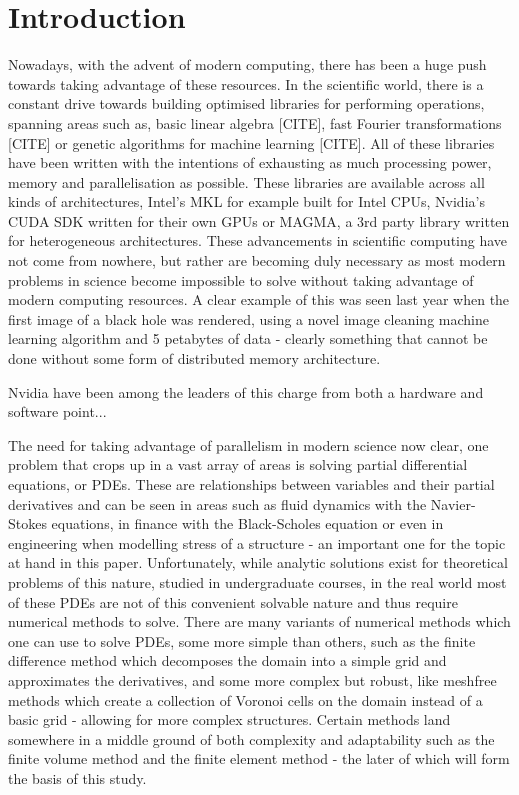 \clearpage
\chapter{Introduction}

Nowadays, with the advent of modern computing, there has been a huge push towards taking advantage of these resources. In the scientific world, there is a constant drive towards building optimised libraries for performing operations, spanning areas such as, basic linear algebra [CITE], fast Fourier transformations [CITE] or genetic algorithms for machine learning [CITE]. All of these libraries have been written with the intentions of exhausting as much processing power, memory and parallelisation as possible. These libraries are available across all kinds of architectures, Intel's MKL for example built for Intel CPUs, Nvidia's CUDA SDK written for their own GPUs or MAGMA, a 3rd party library written for heterogeneous architectures. These advancements in scientific computing have not come from nowhere, but rather are becoming duly necessary as most modern problems in science become impossible to solve without taking advantage of modern computing resources. A clear example of this was seen last year when the first image of a black hole was rendered, using a novel image cleaning machine learning algorithm and 5 petabytes of data - clearly something that cannot be done without some form of distributed memory architecture.

Nvidia have been among the leaders of this charge from both a hardware and software point...

The need for taking advantage of parallelism in modern science now clear, one problem that crops up in a vast array of areas is solving partial differential equations, or PDEs. These are relationships between variables and their partial derivatives and can be seen in areas such as fluid dynamics with the Navier-Stokes equations, in finance with the Black-Scholes equation or even in engineering when modelling stress of a structure - an important one for the topic at hand in this paper. Unfortunately, while analytic solutions exist for theoretical problems of this nature, studied in undergraduate courses, in the real world most of these PDEs are not of this convenient solvable nature and thus require numerical methods to solve. There are many variants of numerical methods which one can use to solve PDEs, some more simple than others, such as the finite difference method which decomposes the domain into a simple grid and approximates the derivatives, and some more complex but robust, like meshfree methods which create a collection of Voronoi cells on the domain instead of a basic grid - allowing for more complex structures. Certain methods land somewhere in a middle ground of both complexity and adaptability such as the finite volume method and the finite element method - the later of which will form the basis of this study.

